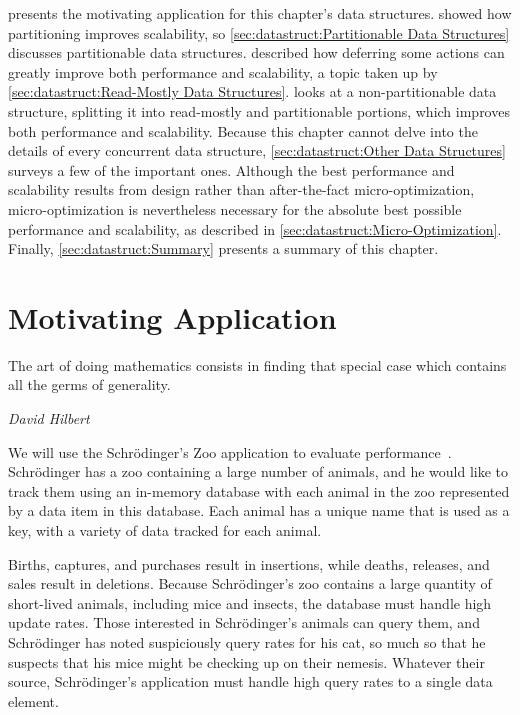 presents the motivating application for this chapter's data structures.
 showed how
partitioning improves scalability, so
\cref{sec:datastruct:Partitionable Data Structures}
discusses partitionable data structures.
 described how deferring some
actions can greatly improve both performance and scalability,
a topic taken up by
\cref{sec:datastruct:Read-Mostly Data Structures}.
looks at a non-partitionable data structure, splitting
it into read-mostly and partitionable portions,
which improves both performance and scalability.
Because this chapter cannot delve into the details of every concurrent
data structure,
\cref{sec:datastruct:Other Data Structures}
surveys a few of the important ones.
Although the best performance and scalability results from design rather
than after-the-fact micro-optimization, micro-optimization is nevertheless
necessary for the absolute best possible performance and scalability,
as described in
\cref{sec:datastruct:Micro-Optimization}.
Finally, \cref{sec:datastruct:Summary}
presents a summary of this chapter.

\fi

\section{Motivating Application}
\label{sec:datastruct:Motivating Application}
%
\epigraph{The art of doing mathematics consists in finding that special
	  case which contains all the germs of generality.}
	 {\emph{David Hilbert}}

We will use the Schr\"odinger's Zoo application to evaluate
performance~\cite{McKenney:2013:SDS:2483852.2483867}.
Schr\"odinger has a zoo containing a large number of animals, and
he would like to track them using an in-memory database with
each animal in the zoo represented by a data item in this database.
Each animal has a unique name that is used as a key, with a variety
of data tracked for each animal.

Births, captures, and purchases result in insertions, while deaths,
releases, and sales result in deletions.
Because Schr\"odinger's zoo contains a large quantity of short-lived
animals, including mice and insects, the database must handle
high update rates.
Those interested in Schr\"odinger's animals can query them, and
Schr\"odinger has noted suspiciously query rates for his cat, so much
so that he suspects that his mice might be checking up on their nemesis.
Whatever their source, Schr\"odinger's application must handle high
query rates to a single data element.

